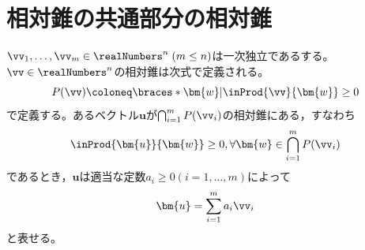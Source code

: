    \section{相対錐の共通部分の相対錐}
        \begin{shadebox}
            $\vv_1,\dotsc,\vv_m\in\realNumbers^n \;(m\leq n)$は一次独立であるする。
            $\vv\in\realNumbers^n$の相対錐は次式で定義される。
            \[P(\vv)\coloneq\braces*{\bm{w}|\inProd{\vv}{\bm{w}}\geq0}\]
            で定義する。あるベクトル$\bm{u}$が$\bigcap_{i=1}^{m}{P(\vv_i)}$の相対錐にある，すなわち
            \[\inProd{\bm{u}}{\bm{w}}\geq0,\forall\bm{w}\in\bigcap_{i=1}^{m}{P(\vv_i)}\]
            であるとき，$\bm{u}$は適当な定数$a_i\geq0(i=1,\dotsc,m)$によって
            \[\bm{u} = \sum_{i=1}^{m}{a_i\vv_i}\]
            と表せる。
        \end{shadebox}
